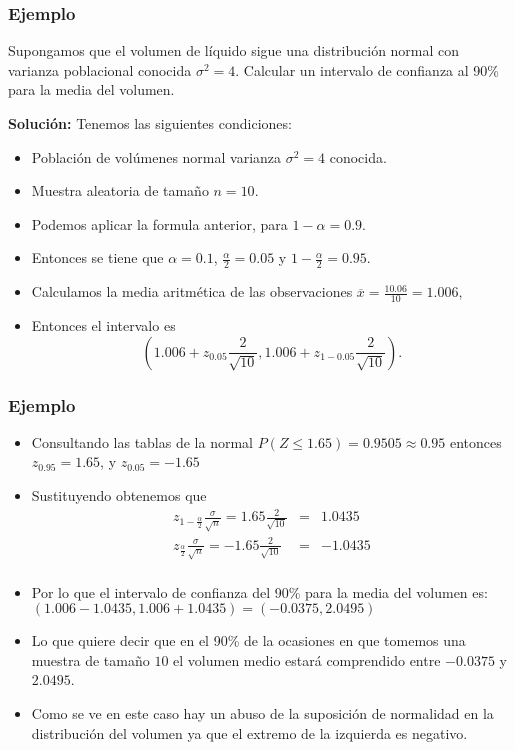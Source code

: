 \begin{frame}
\frametitle{Ejemplo}
        Supongamos que el volumen de líquido sigue una distribución normal con
        varianza poblacional conocida $\sigma^2=4$. Calcular un intervalo de confianza al 90\% para
        la media del volumen.

    \textbf{Solución:}
    Tenemos las siguientes condiciones:

     \begin{itemize}
    \item Población de volúmenes normal varianza $\sigma^2=4$ conocida.
    \item Muestra aleatoria de tamaño $n=10$.
    \end{itemize}
\end{frame}

\begin{frame}
\begin{itemize}
\item  Podemos  aplicar la formula anterior,  para $1-\alpha=0.9$.
\item  Entonces se tiene que $\alpha=0.1$, $\frac{\alpha}{2}= 0.05$ y  $1-\frac{\alpha}{2}=0.95$.
\item Calculamos la media aritmética de las observaciones $\overline{x}=\frac{10.06}{10}=1.006,$
\item Entonces el intervalo es
$$\left(1.006+z_{0.05}\frac{2}{\sqrt{10}},1.006+z_{1-0.05}\frac{2}{\sqrt{10}}\right).$$
\end{itemize}
\end{frame}

\begin{frame}
\frametitle{Ejemplo}
\begin{itemize}
\item Consultando las tablas de la normal $P(Z\leq 1.65)=0.9505\approx0.95$ entonces  $z_{0.95}=1.65$, y $z_{0.05}=-1.65$
\item Sustituyendo obtenemos que
\begin{eqnarray*}
    z_{1-\frac{\alpha}{2}}\frac{\sigma}{\sqrt{n}}=1.65 \frac{2}{\sqrt{10}}&=& 1.0435\\
   z_{\frac{\alpha}{2}}\frac{\sigma}{\sqrt{n}}=-1.65 \frac{2}{\sqrt{10}}&=&- 1.0435\\
\end{eqnarray*}
\item Por lo que  el intervalo de confianza del 90\% para la media del volumen es:
$\left(1.006- 1.0435,1.006+ 1.0435\right)=\left(-0.0375 , 2.0495\right)$
\item Lo que quiere decir que en el 90\% de la ocasiones en que tomemos una muestra de tamaño
$10$ el volumen medio estará comprendido entre $-0.0375$ y $2.0495$. 
\item Como se ve en este caso hay un abuso de la suposición de normalidad en la distribución del volumen ya que el extremo de la
izquierda es negativo.
\end{itemize}
\end{frame}


